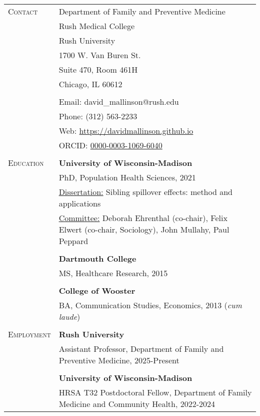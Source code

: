 \documentclass[letterpaper,10pt,oneside]{article}
\begin{document}
\begin{longtable}{@{} p{} p{}}
\textsc{Contact}   & Department of Family and Preventive Medicine \\
     & Rush Medical College \\
     & Rush University \\ 
     & 1700 W. Van Buren St. \\
     & Suite 470, Room 461H \\
     & Chicago, IL 60612 \\
     & \\
     & Email: david\_mallinson@rush.edu \\
     & Phone: (312) 563-2233 \\
     & Web: \href{https://davidmallinson.github.io}{https://davidmallinson.github.io} \\
     & ORCID: \href{https://orcid.org/0000-0003-1069-6040/}{0000-0003-1069-6040} \\
     & \\
\textsc{Education}    & \textbf{University of Wisconsin-Madison} \\
     & PhD, Population Health Sciences, 2021 \\
     & \parbox{6.15in}{\underline{Dissertation:} Sibling spillover effects: method and applications} \\
     & \parbox{6.15in}{\underline{Committee:} Deborah Ehrenthal (co-chair), Felix Elwert (co-chair, Sociology), John Mullahy, Paul Peppard} \\
     & \\
     & \textbf{Dartmouth College} \\
     & MS, Healthcare Research, 2015 \\
     & \\
     & \textbf{College of Wooster} \\
     & BA, Communication Studies, Economics, 2013 (\textit{cum laude}) \\
     & \\
\textsc{Employment} & \textbf{Rush University} \\
     & Assistant Professor, Department of Family and Preventive Medicine, 2025-Present \\
     & \\
     & \textbf{University of Wisconsin-Madison} \\
     & HRSA T32 Postdoctoral Fellow, Department of Family Medicine and Community Health, 2022-2024 \\

\end{longtable}
\end{document}
